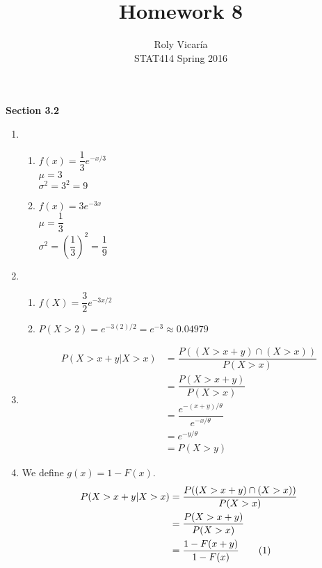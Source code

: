 \documentclass{article}
\title{Homework 8}
\author{Roly Vicar\'ia \\ STAT414 Spring 2016}
\newcommand\numberthis{\addtocounter{equation}{1}\tag{\theequation}}
\begin{document}
    
    \maketitle
    
    \textbf{Section 3.2}
    \begin{enumerate}
     \item 
      \begin{enumerate}
       \item 
	$f(x) = \dfrac{1}{3}e^{-x/3}$ \\
	$\mu = 3$ \\
	$\sigma^2 = 3^2 = 9$
       
       \item
	$f(x) = 3e^{-3x}$ \\
	$\mu = \dfrac{1}{3}$ \\
	$\sigma^2 = \left(\dfrac{1}{3}\right)^2 = \dfrac{1}{9}$
      \end{enumerate}
     
     \item
      \begin{enumerate}
       \item 
	$f(X) = \dfrac{3}{2}e^{-3x/2}$
       
       \item
	$P(X > 2) = e^{-3(2)/2} = e^{-3} \approx 0.04979$
      \end{enumerate}
     
     \item
      \begin{align*}
       P(X > x + y | X > x) &= \dfrac{P((X > x + y) \cap (X > x))}{P(X > x)} \\
	&= \dfrac{P(X > x + y)}{P(X > x)} \\
	&= \dfrac{e^{-(x+y)/\theta}}{e^{-x/\theta}} \\
	&= e^{-y/\theta} \\
	&= P(X > y)
      \end{align*}
     
     \item
      We define $g(x) = 1 - F(x)$. 
      \begin{align*}
       P(X > x + y | X > x) &= \dfrac{P((X > x+y) \cap (X > x))}{P(X>x)} \\
	&= \dfrac{P(X > x+y)}{P(X>x)} \\
	&= \dfrac{1 - F(x+y)}{1 - F(x)}  \numberthis
      \end{align*}
      

\end{enumerate}
\end{document}
